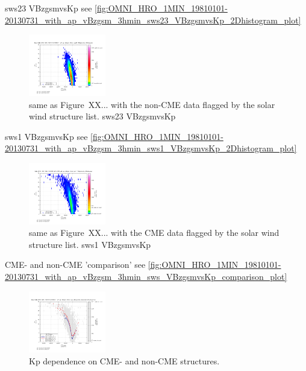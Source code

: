 sws23 VBzgsmvsKp see \autoref{fig:OMNI_HRO_1MIN_19810101-20130731_with_ap_vBzgsm_3hmin_sws23_VBzgsmvsKp_2Dhistogram_plot}
\begin{figure}[htb]
	\centering
	\includegraphics[width=0.3\textwidth]{images/gnuplots/OMNI_HRO_1MIN_19810101-20130731_with_ap_vBzgsm_3hmin_sws23_VBzgsmvsKp_2Dhistogram_plot.png}
	\caption{same as Figure~XX... with the non-CME data flagged by the solar wind structure list. sws23 VBzgsmvsKp}
	\label{fig:OMNI_HRO_1MIN_19810101-20130731_with_ap_vBzgsm_3hmin_sws23_VBzgsmvsKp_2Dhistogram_plot}
\end{figure}

sws1 VBzgsmvsKp see \autoref{fig:OMNI_HRO_1MIN_19810101-20130731_with_ap_vBzgsm_3hmin_sws1_VBzgsmvsKp_2Dhistogram_plot}
\begin{figure}[htb]
	\centering
	\includegraphics[width=0.3\textwidth]{images/gnuplots/OMNI_HRO_1MIN_19810101-20130731_with_ap_vBzgsm_3hmin_sws1_VBzgsmvsKp_2Dhistogram_plot.png}
	\caption{same as Figure~XX... with the CME data flagged by the solar wind structure list. sws1 VBzgsmvsKp}
	\label{fig:OMNI_HRO_1MIN_19810101-20130731_with_ap_vBzgsm_3hmin_sws1_VBzgsmvsKp_2Dhistogram_plot}
\end{figure}

CME- and non-CME 'comparison' see \autoref{fig:OMNI_HRO_1MIN_19810101-20130731_with_ap_vBzgsm_3hmin_sws_VBzgsmvsKp_comparison_plot}
\begin{figure}[htb]
	\centering
	\includegraphics[width=0.3\textwidth]{images/gnuplots/OMNI_HRO_1MIN_19810101-20130731_with_ap_vBzgsm_3hmin_sws_VBzgsmvsKp_comparison_plot.png}
	\caption{Kp dependence on CME- and non-CME structures.}
	\label{fig:OMNI_HRO_1MIN_19810101-20130731_with_ap_vBzgsm_3hmin_sws_VBzgsmvsKp_comparison_plot}
\end{figure}

